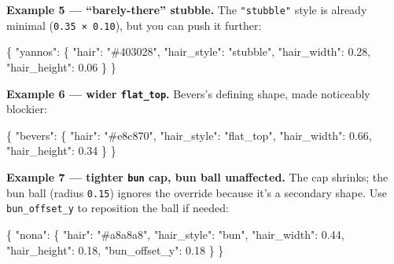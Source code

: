 \documentclass[
  12pt,
  letterpaper,
]{book}
\newenvironment{Shaded}{}{}
\newcommand{\DataTypeTok}[1]{\textcolor[rgb]{0.56,0.13,0.00}{#1}}
\newcommand{\FloatTok}[1]{\textcolor[rgb]{0.25,0.63,0.44}{#1}}
\newcommand{\FunctionTok}[1]{\textcolor[rgb]{0.02,0.16,0.49}{#1}}
\newcommand{\StringTok}[1]{\textcolor[rgb]{0.25,0.44,0.63}{#1}}
\begin{document}
\textbf{Example 5 --- ``barely-there'' stubble.} The
\texttt{"stubble"} style is already minimal (\texttt{0.35\ ×\ 0.10}),
but you can push it further:

\begin{Shaded}
\begin{Highlighting}[]
\FunctionTok{\{}
  \DataTypeTok{"yannos"}\FunctionTok{:} \FunctionTok{\{}
    \DataTypeTok{"hair"}\FunctionTok{:}        \StringTok{"\#403028"}\FunctionTok{,}
    \DataTypeTok{"hair\_style"}\FunctionTok{:}  \StringTok{"stubble"}\FunctionTok{,}
    \DataTypeTok{"hair\_width"}\FunctionTok{:}  \FloatTok{0.28}\FunctionTok{,}
    \DataTypeTok{"hair\_height"}\FunctionTok{:} \FloatTok{0.06}
  \FunctionTok{\}}
\FunctionTok{\}}
\end{Highlighting}
\end{Shaded}

\textbf{Example 6 --- wider \texttt{flat\_top}.} Bevers's defining
shape, made noticeably blockier:

\begin{Shaded}
\begin{Highlighting}[]
\FunctionTok{\{}
  \DataTypeTok{"bevers"}\FunctionTok{:} \FunctionTok{\{}
    \DataTypeTok{"hair"}\FunctionTok{:}        \StringTok{"\#e8c870"}\FunctionTok{,}
    \DataTypeTok{"hair\_style"}\FunctionTok{:}  \StringTok{"flat\_top"}\FunctionTok{,}
    \DataTypeTok{"hair\_width"}\FunctionTok{:}  \FloatTok{0.66}\FunctionTok{,}
    \DataTypeTok{"hair\_height"}\FunctionTok{:} \FloatTok{0.34}
  \FunctionTok{\}}
\FunctionTok{\}}
\end{Highlighting}
\end{Shaded}

\textbf{Example 7 --- tighter \texttt{bun} cap, bun ball
unaffected.} The cap shrinks; the bun ball (radius \texttt{0.15})
ignores the override because it's a secondary shape. Use
\texttt{bun\_offset\_y} to reposition the ball if needed:

\begin{Shaded}
\begin{Highlighting}[]
\FunctionTok{\{}
  \DataTypeTok{"nona"}\FunctionTok{:} \FunctionTok{\{}
    \DataTypeTok{"hair"}\FunctionTok{:}          \StringTok{"\#a8a8a8"}\FunctionTok{,}
    \DataTypeTok{"hair\_style"}\FunctionTok{:}    \StringTok{"bun"}\FunctionTok{,}
    \DataTypeTok{"hair\_width"}\FunctionTok{:}    \FloatTok{0.44}\FunctionTok{,}
    \DataTypeTok{"hair\_height"}\FunctionTok{:}   \FloatTok{0.18}\FunctionTok{,}
    \DataTypeTok{"bun\_offset\_y"}\FunctionTok{:}  \FloatTok{0.18}
  \FunctionTok{\}}
\FunctionTok{\}}
\end{Highlighting}
\end{Shaded}
\end{document}
